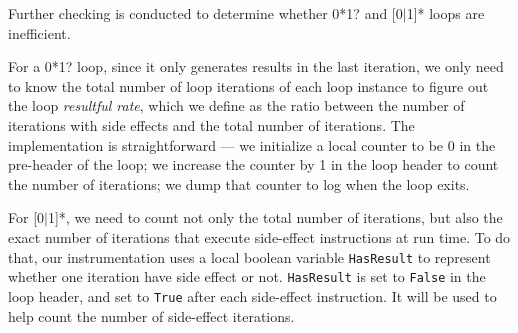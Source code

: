 Further checking is conducted to determine whether 0*1? and [0$|$1]* 
loops are inefficient.

For a 0*1? loop, since it only generates results in the last iteration, we 
only need to know the total number of loop iterations of each loop instance
to figure out the loop
\textit{resultful rate}, which we define as the ratio between
the number of iterations with
side effects and the total number of iterations. 
The implementation is straightforward
--- we initialize a local counter to be 0 in the pre-header of the loop; we 
increase the counter by 1 in the loop header to count the number of 
iterations; we dump that counter to log when the loop exits.

For [0$|$1]*, we need to count not only the total number of iterations, but
also the exact number of iterations that execute side-effect instructions
at run time. 
To do that, our instrumentation uses a local boolean variable 
\texttt{HasResult} to represent whether one iteration have side effect or not. 
\texttt{HasResult} is set to \texttt{False} in the loop header, and set to
\texttt{True} after each side-effect instruction. It will be used to help
count the number of side-effect iterations. 



